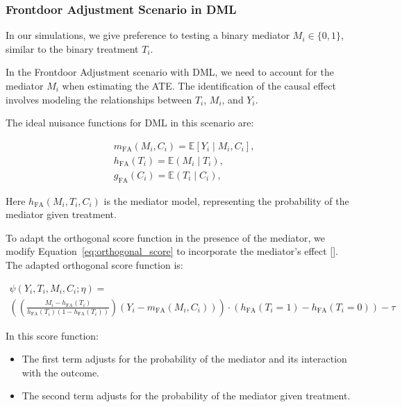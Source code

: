 \documentclass{article}
\numberwithin{equation}{section}
\begin{document}
\subsubsection{Frontdoor Adjustment Scenario in DML}

In our simulations, we give preference to testing a binary mediator $M_i \in \{0, 1\}$, similar to the binary treatment $T_i$.

In the Frontdoor Adjustment scenario with DML, we need to account for the mediator $M_i$ when estimating the ATE. The identification of the causal effect involves modeling the relationships between $T_i$, $M_i$, and $Y_i$.

The ideal nuisance functions for DML in this scenario are:

\begin{align}
    & m_{\text{FA}}(M_i, C_i) = \mathbb{E}[Y_i \mid M_i, C_i],
    \label{eq:m_x_for_target_frontdoor_adjustment} \\
    & h_{\text{FA}}(T_i) = \mathbb{E}(M_i \mid T_i),
    \label{eq:h_x_for_mediator_frontdoor_adjustment} \\
    & g_{\text{FA}}(C_i) = \mathbb{E}(T_i \mid C_i),
    \label{eq:g_x_for_treatment_frontdoor_adjustment}
\end{align}

Here $h_{\text{FA}}(M_i, T_i, C_i)$ is the mediator model, representing the probability of the mediator given treatment.

To adapt the orthogonal score function in the presence of the mediator, we modify Equation~\eqref{eq:orthogonal_score} to incorporate the mediator's effect [\cite{ChernozhukovChetverikovDemireretal2018}]. The adapted orthogonal score function is:

\begin{equation}
    \begin{split}
        \psi(Y_i, T_i, M_i, C_i; \eta) = \\ \left(
        \left(
            \frac{M_i - h_{\text{FA}}(T_i)}{h_{\text{FA}}(T_i)(1 - h_{\text{FA}}(T_i))}
        \right) (Y_i - m_{\text{FA}}(M_i, C_i))
        \right)
        \cdot \left(
            h_{\text{FA}}(T_i = 1) - h_{\text{FA}}(T_i = 0)
        \right)
        - \tau
    \end{split}
    \label{eq:orthogonal_score_frontdoor}
\end{equation}

In this score function:

\begin{itemize}
    \item The first term adjusts for the probability of the mediator and its interaction with the outcome.
    \item The second term adjusts for the probability of the mediator given treatment.
\end{itemize}
\end{document}
